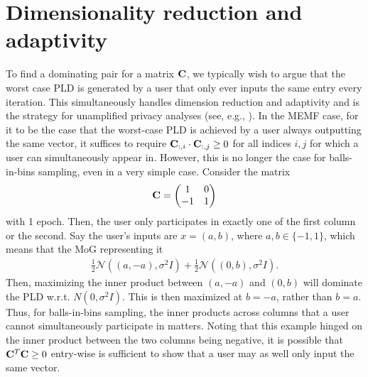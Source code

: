 \section{Dimensionality reduction and adaptivity}\label{sec:dim-red}
To find a dominating pair for a matrix $\mathbf{C}$, we typically wish to argue that the worst case PLD is generated by a user that only ever inputs the same entry every iteration.
This simultaneously handles dimension reduction and adaptivity and is the strategy for unamplified privacy analyses (see, e.g., \citet{choquette2022multi}).
In the MEMF case, for it to be the case that the worst-case PLD is achieved by a user always outputting the same vector, it suffices to require $\mathbf{C}_{:, i} \cdot \mathbf{C}_{:, j} \geq 0$ for all indices $i,j$ for which a user can simultaneously appear in.
However, this is no longer the case for balls-in-bins sampling, even in a very simple case.
Consider the matrix
\begin{align*}
  \mathbf{C} =
  \begin{pmatrix}
    1 & 0 \\
    -1 & 1
  \end{pmatrix}
\end{align*}
with 1 epoch.
Then, the user only participates in exactly one of the first column or the second.
Say the user's inputs are $x = (a,b)$, where $a,b \in \{-1, 1\}$, which means that the MoG representing it
\begin{align*}
  \frac{1}{2}\mathcal{N}((a,-a), \sigma^2 I) +
  \frac{1}{2}\mathcal{N}((0, b), \sigma^2 I).
\end{align*}
Then, maximizing the inner product between $(a,-a)$ and $(0, b)$ will dominate the PLD w.r.t. $N(0, \sigma^2 I)$.
This is then maximized at $b=-a$, rather than $b=a$.
Thus, for balls-in-bins sampling, the inner products across columns that a user cannot simultaneously participate in matters.
Noting that this example hinged on the inner product between the two columns being negative, it is possible that $\mathbf{C}^T\mathbf{C} \geq 0$ entry-wise is sufficient to show that a user may as well only input the same vector.
